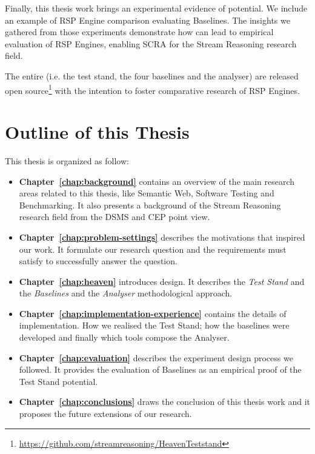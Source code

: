 Finally, this thesis work brings an experimental evidence of \name potential. We include an example of RSP Engine comparison evaluating \name Baselines. %
The insights we gathered from those experiments demonstrate how \name can lead to empirical evaluation of RSP Engines, enabling SCRA for the Stream Reasoning research field.

The entire \name (i.e. the test stand, the four baselines and the analyser) are released open source\footnote{\url{https://github.com/streamreasoning/HeavenTeststand}} with the intention to foster comparative research of RSP Engines.

\section{Outline of this Thesis}\label{sec:thesis-structure-intro}

This thesis is organized as follow:

\begin{itemize}

\item \textbf{Chapter~\ref{chap:background}} contains an overview of the main research areas related to this thesis, like Semantic Web, Software Testing and Benchmarking. It also presents a background of the Stream Reasoning research field from the DSMS and CEP point view.
\item \textbf{Chapter~\ref{chap:problem-settings}} describes the motivations that inspired our work. It formulate our research question and the requirements \name must satisfy to successfully answer the question.
\item \textbf{Chapter~\ref{chap:heaven}} introduces \name design. It describes the \textit{Test Stand} and the \textit{Baselines} and the \textit{Analyser} methodological approach.
\item \textbf{Chapter~\ref{chap:implementation-experience}} contains the details of \name implementation. How we realised the Test Stand; how the baselines were developed and finally which tools compose the Analyser.
\item \textbf{Chapter~\ref{chap:evaluation}} describes the experiment design process we followed. It provides the evaluation of \name Baselines as an empirical proof of the Test Stand potential.
\item \textbf{Chapter~\ref{chap:conclusions}} draws the conclusion of this thesis work and it proposes the future extensions of our research.
\end{itemize}
